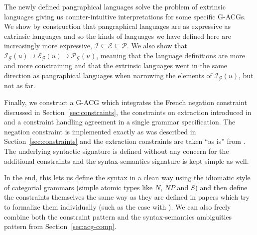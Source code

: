 \documentclass[twocolumn]{article}
\begin{document}
The newly defined pangraphical languages solve the problem of extrinsic
languages giving us counter-intuitive interpretations for some specific
G-ACGs. We show by construction that pangraphical languages are as
expressive as extrinsic languages and so the kinds of languages we have
defined here are increasingly more expressive, $\mathcal{I} \subseteq
\mathcal{E} \subseteq \mathcal{P}$. We also show that
$\mathcal{I}_{\mathcal{G}}(u) \supseteq \mathcal{E}_{\mathcal{G}}(u)
\supseteq \mathcal{P}_{\mathcal{G}}(u)$, meaning that the language
definitions are more and more constraining and that the extrinsic
languages went in the same direction as pangraphical languages when
narrowing the elements of $\mathcal{I}_{\mathcal{G}}(u)$, but not as
far.

Finally, we construct a G-ACG which integrates the French negation
constraint discussed in Section~\ref{sec:constraints}, the constraints
on extraction introduced in \cite{pogodalla2012controlling} and a
constraint handling agreement in a single grammar specification. The
negation constraint is implemented exactly as was described in
Section~\ref{sec:constraints} and the extraction constraints are taken
``as is'' from \cite{pogodalla2012controlling}. The underlying syntactic
signature is defined without any concern for the additional constraints
and the syntax-semantics signature is kept simple as well.

In the end, this lets us define the syntax in a clean way using the
idiomatic style of categorial grammars (simple atomic types like $N$,
$NP$ and $S$) and then define the constraints themselves the same way as
they are defined in papers which try to formalize them individually
(such as the case with \cite{pogodalla2012controlling}). We can also
freely combine both the constraint pattern and the syntax-semantics
ambiguities pattern from Section~\ref{sec:acg-comp}.



\end{document}
